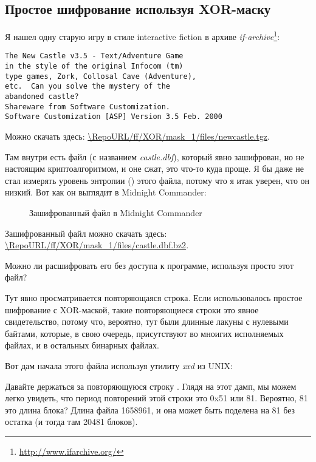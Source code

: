\subsection{Простое шифрование используя XOR-маску}
\label{XOR_mask_1}

Я нашел одну старую игру в стиле interactive fiction в архиве \emph{if-archive}\footnote{\url{http://www.ifarchive.org/}}:

\begin{lstlisting}
The New Castle v3.5 - Text/Adventure Game
in the style of the original Infocom (tm)
type games, Zork, Collosal Cave (Adventure),
etc.  Can you solve the mystery of the
abandoned castle?
Shareware from Software Customization.
Software Customization [ASP] Version 3.5 Feb. 2000
\end{lstlisting}

Можно скачать здесь: \url{\RepoURL/ff/XOR/mask_1/files/newcastle.tgz}.

Там внутри есть файл (с названием \emph{castle.dbf}), который явно зашифрован, но не настоящим криптоалгоритмом,
и оне сжат, это что-то куда проще.
Я бы даже не стал измерять уровень энтропии () этого файла, потому что я итак уверен, что он низкий.
Вот как он выглядит в Midnight Commander:

\begin{figure}[H]
\centering
{}
\caption{Зашифрованный файл в Midnight Commander}
\end{figure}

Зашифрованный файл можно скачать здесь:
\url{\RepoURL/ff/XOR/mask_1/files/castle.dbf.bz2}.

Можно ли расшифровать его без доступа к программе, используя просто этот файл?

Тут явно просматривается повторяющаяся строка. 
Если использовалось простое шифрование с XOR-маской, такие повторяющиеся строки это явное свидетельство,
потому что, вероятно, тут были длинные лакуны с нулевыми байтами, которые, в свою очередь, присутствуют
во мноигих исполняемых файлах, и в остальных бинарных файлах.

Вот дам начала этого файла используя утилиту \emph{xxd} из UNIX:



Давайте держаться за повторяющуюся строку .
Глядя на этот дамп, мы можем легко увидеть, что период повторений этой строки это 0x51 или 81.
Вероятно, 81 это длина блока?
Длина файла 1658961, и она может быть поделена на 81 без остатка (и тогда там 20481 блоков).

